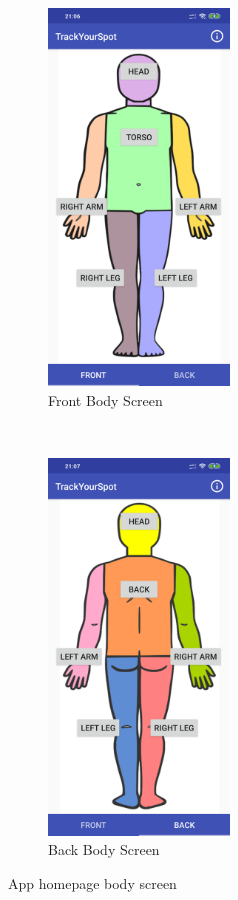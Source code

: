 \begin{figure}[t!]
    \centering
    \begin{subfigure}[t]{0.5\textwidth}
        \centering
        \includegraphics[height=10cm]{figures/frontbodybuttons.png}
        \caption{Front Body Screen}
    \end{subfigure}%
    ~
    \begin{subfigure}[t]{0.5\textwidth}
        \centering
        \includegraphics[height=10cm]{figures/backbodybuttons.png}
        \caption{Back Body Screen}
    \end{subfigure}
    \caption{App homepage body screen}
    \label{fig:bodyfinalscreen}
\end{figure}

